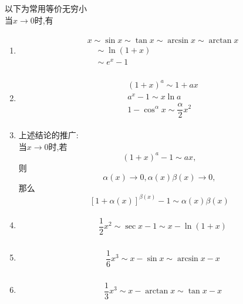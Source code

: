 \documentclass[8pt a4paper, oneside, UTF8]{ctexbook}
\begin{document}
\begin{sloppypar}
    以下为常用等价无穷小
    \\当$x \to 0$时,有
    \begin{enumerate}
        \item     \begin{align*} \boxed{\begin{aligned}& x \sim \sin x \sim \tan x \sim \arcsin x \sim \arctan x \nonumber \\& \quad  \sim \ln (1+x)  \nonumber                                  \\& \quad \sim e^x -1 \nonumber\end{aligned} }\end{align*}
        \item     \begin{align*} \boxed{\begin{aligned}& (1+x)^a \sim  1+ax   \\& a^x - 1 \sim x \ln a \\& 1- \cos^{\alpha} x \sim \dfrac{\alpha}{2}x^2\end{aligned}}\end{align*}
        \item  上述结论的推广:\\
        当$x \to 0$时,若$$(1+x)^a -1 \sim ax,$$则$$\alpha (x) \to 0,\alpha(x)\beta(x) \to 0,$$那么$$[1+\alpha(x)]^{\beta(x)} -1 \sim \alpha(x) \beta(x)$$
        \item     \begin{align*} \boxed
            {
                \begin{aligned}
                     & \dfrac{1}{2} x^2  \sim \sec x -1 \sim x- \ln(1+x)
                \end{aligned}
            }
        \end{align*}
        \item     \begin{align*} \boxed
            {
                \begin{aligned}
                     & \dfrac{1}{6} x^3 \sim x-\sin x \sim \arcsin x -x
                \end{aligned}
            }
        \end{align*}
        \item     \begin{align*} \boxed
            {
                \begin{aligned}
                     & \dfrac{1}{3} x^3 \sim x-\arctan x \sim \tan x-x
                \end{aligned}
}
\end{align*}
\end{enumerate}
\end{sloppypar}
\end{document}
